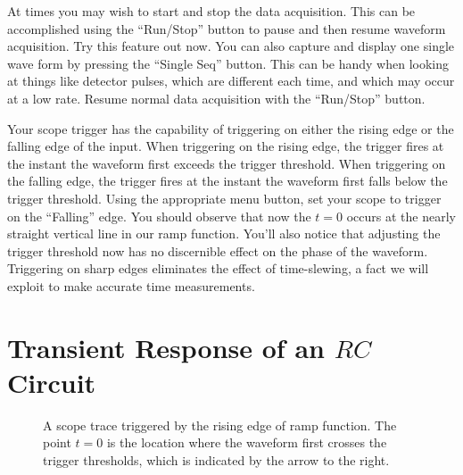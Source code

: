 At times you may wish to start and stop the data acquisition.  This
can be accomplished using the ``Run/Stop'' button to pause and then
resume waveform acquisition.  Try this feature out now.  You can also
capture and display one single wave form by pressing the ``Single
Seq'' button.  This can be handy when looking at things like detector
pulses, which are different each time, and which may occur at a low
rate.  Resume normal data acquisition with the ``Run/Stop'' button.

Your scope trigger has the capability of triggering on either the
rising edge or the falling edge of the input.  When triggering on the
rising edge, the trigger fires at the instant the waveform first
exceeds the trigger threshold.  When triggering on the falling edge,
the trigger fires at the instant the waveform first falls below the
trigger threshold.  Using the appropriate menu button, set your scope
to trigger on the ``Falling'' edge.  You should observe that now the
$t=0$ occurs at the nearly straight vertical line in our ramp
function.  You'll also notice that adjusting the trigger threshold now
has no discernible effect on the phase of the waveform.  Triggering on
sharp edges eliminates the effect of time-slewing, a fact we will
exploit to make accurate time measurements.

\section{Transient Response of an $RC$ Circuit}

\begin{figure}[htbp]
\begin{center}
\caption{A scope trace triggered by the rising edge of ramp function.  The point $t=0$ is the location where the waveform first crosses the trigger thresholds, which is indicated by the arrow to the right.}
\label{fig:probe_setup}
\end{center}
\end{figure}

